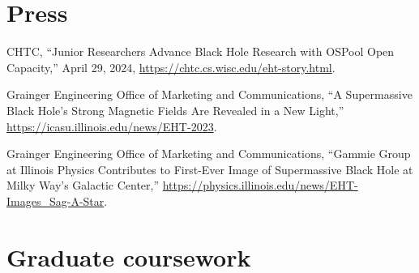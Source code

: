 \documentclass[11pt]{article}
\begin{document}
\else\fi

\ifdefined\withpress{}
\section*{Press}
CHTC, “Junior Researchers Advance Black Hole Research with OSPool Open Capacity,” April 29, 2024, \href{https://chtc.cs.wisc.edu/eht-story.html}{https://chtc.cs.wisc.edu/eht-story.html}.

Grainger Engineering Office of Marketing and Communications, “A Supermassive Black Hole’s Strong Magnetic Fields Are Revealed in a New Light,” \href{https://icasu.illinois.edu/news/EHT-2023}{https://icasu.illinois.edu/news/EHT-2023}.

Grainger Engineering Office of Marketing and Communications, “Gammie Group at Illinois Physics Contributes to First-Ever Image of Supermassive Black Hole at Milky Way’s Galactic Center,” \href{https://physics.illinois.edu/news/EHT-Images\_Sag-A-Star}{https://physics.illinois.edu/news/EHT-Images\_Sag-A-Star}.

\else\fi

\ifdefined\withcourses{}
\section*{Graduate coursework}

\else\fi
\end{document}
